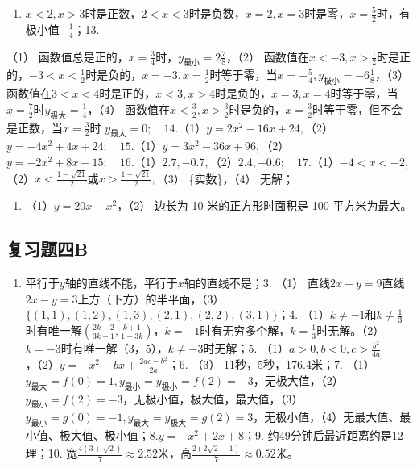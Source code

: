 \begin{enumerate}[start=12]
\item
  \(x < 2, x > 3\)时是正数，\(2 < x < 3\)时是负数，\(x = 2, x = 3\)时是零，\(x = \frac{5}{2}\)时，有极小值\(-\frac{1}{4}\)；13.
\end{enumerate}
（1）
函数值总是正的，\(x = \frac{3}{4}\)时，\(y_{\text{最小}} = 2\frac{7}{8}\)，（2）
函数值在\(x < -3, x > \frac{1}{2}\)时是正的，\(-3 < x < \frac{1}{2}\)时是负的，\(x = -3, x = \frac{1}{2}\)时等于零，当\(x = -\frac{5}{4}, y_{\text{极小}} = -6\frac{1}{8}\)，（3）
函数值在\(3 < x < 4\)时是正的，\(x < 3, x > 4\)时是负的，\(x = 3, x = 4\)时等于零，当\(x = \frac{7}{2}\)时\(y_{\text{极大}} = \frac{1}{4}\)，（4）
函数值在\(x < \frac{3}{2}, x > \frac{3}{2}\)时是负的，\(x = \frac{3}{2}\)时等于零，但不会是正数，当\(x = \frac{3}{2}\)时
\(y_{\text{最大}} = 0; \quad 14.\)（1）\(y = 2x^{2} - 16x + 24,\)（2）\(y = -4x^{2} + 4x + 24; \quad 15.\)（1）\(y = 3x^{2} - 36x + 96,\)（2）\(y = -2x^{2} + 8x - 15; \quad 16.\)（1）\(2.7, -0.7,\)（2）\(2.4, -0.6; \quad 17.\)（1）\(-4 < x < -2,\)（2）\(x < \frac{1 - \sqrt{21}}{2}\)或\(x > \frac{1 + \sqrt{21}}{2},\)（3）
\{实数\}，（4） 无解；

\begin{enumerate}[start=18]
\item
  （1）\(y = 20x - x^2\)，（2） 边长为 10 米的正方形时面积是 100
  平方米为最大。
\end{enumerate}

\subsection{复习题四B}

\begin{enumerate}
\item
  平行于\(y\)轴的直线不能，平行于\(x\)轴的直线不是；3. （1）
  直线\(2x - y = 9\)直线\(2x - y = 3\)上方（下方）的半平面，（3）\(\{(1, 1), (1, 2), (1, 3), (2, 1), (2, 2), (3, 1)\}\)；4.
  （1）\(k \neq -1\)和\(k \neq \frac{1}{3}\)时有唯一解\(\left(\frac{2k - 2}{3k - 1}, \frac{k + 1}{1 - 3k}\right)\)，\(k = -1\)时有无穷多个解，\(k = \frac{1}{3}\)时无解。（2）\(k = -3\)时有唯一解（3，5），\(k \neq -3\)时无解；5.
  （1）\(a > 0, b < 0, c > \frac{b^2}{4a}\)，（2）\(y = -x^2 - bx + \frac{2ac - b^2}{2a}\)；6.
  （3） 11秒，5秒，176.4米；7.
  （1）\(y_{\text{最大}} = f(0) = 1, y_{\text{最小}} = y_{\text{极小}} = f(2) = -3\)，无极大值，（2）\(y_{\text{最小}} = f(2) = -3\)，无极小值，极大值，最大值，（3）\(y_{\text{最小}} = g(0) = -1, y_{\text{最大}} = y_{\text{极大}} = g(2) = 3\)，无极小值，（4）无最大值、最小值、极大值、极小值；8.\(y = -x^2 + 2x + 8\)；9.
  约49分钟后最近距离约是12理；10.
  宽\(\frac{4(3 + \sqrt{2})}{7} \approx 2.52\)米，高\(\frac{2(2\sqrt{2} - 1)}{7} \approx 0.52\)米。
\end{enumerate}

